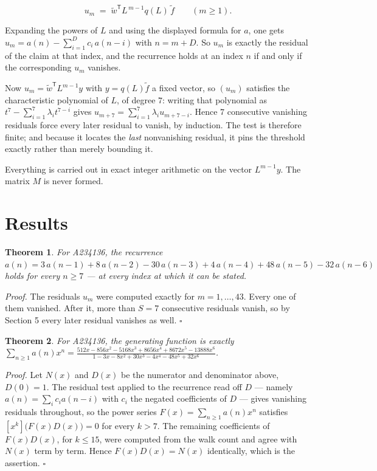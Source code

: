 \documentclass[11pt]{article}
\newtheorem{theorem}{Theorem}
\theoremstyle{definition}
\begin{document}
\[u_m \;=\; \tilde w^{\mathsf T} L^{\,m-1} q(L)\,\tilde f \qquad (m \ge 1).\]

Expanding the powers of $L$ and using the displayed formula for $a$, one gets $u_m = a(n) - \sum_{i=1}^{D} c_i\,a(n-i)$ with $n = m + D$. So $u_m$ is exactly the residual of the claim at that index, and the recurrence holds at an index $n$ if and only if the corresponding $u_m$ vanishes.

Now $u_m = \tilde w^{\mathsf T} L^{m-1} y$ with $y = q(L)\tilde f$ a fixed vector, so $(u_m)$ satisfies the characteristic polynomial of $L$, of degree $7$: writing that polynomial as $t^{7} - \sum_{i=1}^{7} \lambda_i t^{7-i}$ gives $u_{m+7} = \sum_{i=1}^{7} \lambda_i u_{m+7-i}$. Hence $7$ consecutive vanishing residuals force every later residual to vanish, by induction. The test is therefore finite; and because it locates the {\itshape last} nonvanishing residual, it pins the threshold exactly rather than merely bounding it.

Everything is carried out in exact integer arithmetic on the vector $L^{m-1}y$. The matrix $M$ is never formed.

\section{Results}

\begin{theorem} For A234136, the recurrence $a(n) = 3\,a(n-1) + 8\,a(n-2) - 30\,a(n-3) + 4\,a(n-4) + 48\,a(n-5) - 32\,a(n-6)$ holds for every $n \ge 7$ --- at every index at which it can be stated.\end{theorem}

{\itshape Proof.} The residuals $u_m$ were computed exactly for $m = 1,\dots,43$. Every one of them vanished. After it, more than $S = 7$ consecutive residuals vanish, so by Section 5 every later residual vanishes as well. $\square$

\begin{theorem} For A234136, the generating function is exactly $\sum_{n\ge 1} a(n)x^n = \frac{512x - 856x^{2} - 5168x^{3} + 8656x^{4} + 8672x^{5} - 13888x^{6}}{1 - 3x - 8x^{2} + 30x^{3} - 4x^{4} - 48x^{5} + 32x^{6}}$.\end{theorem}

{\itshape Proof.} Let $N(x)$ and $D(x)$ be the numerator and denominator above, $D(0)=1$. The residual test applied to the recurrence read off $D$ --- namely $a(n) = \sum_i c_i a(n-i)$ with $c_i$ the negated coefficients of $D$ --- gives vanishing residuals throughout, so the power series $F(x)=\sum_{n\ge 1}a(n)x^n$ satisfies $[x^k]\bigl(F(x)D(x)\bigr) = 0$ for every $k > 7$. The remaining coefficients of $F(x)D(x)$, for $k \le 15$, were computed from the walk count and agree with $N(x)$ term by term. Hence $F(x)D(x) = N(x)$ identically, which is the assertion. $\square$
\end{document}
